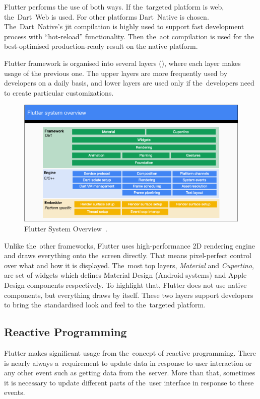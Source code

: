 Flutter performs the use of both ways. If the~targeted platform is web, the~Dart~Web is used. For other platforms Dart~Native is chosen. The~Dart~Native's \gls{jit} compilation is highly used to support fast development process with ``hot-reload'' functionality. Then the~\gls{aot} compilation is used for the best-optimised production-ready result on the native platform.  

Flutter framework is organised into several layers (), where each layer makes usage of the previous one. The upper layers are more frequently used by developers on a daily basis, and lower layers are used only if the~developers need to create particular customizations.

\begin{figure}[htp]
    \centering
    \includegraphics[width=\linewidth]{img/flutter/flutter-layer-cake.png}
    \caption{Flutter System Overview~\cite{flutter-technical-overview}.}
    \label{fig:flutter-layer-cake}
\end{figure}

Unlike the~other frameworks, Flutter uses high-performance 2D rendering engine and draws everything onto the~screen directly. That means pixel-perfect control over what and how it is displayed. The~most top layers, \textit{Material} and \textit{Cupertino}, are set of widgets which defines Material Design (Android systems) and Apple Design components respectively. To highlight that, Flutter does not use native components, but everything draws by itself. These two layers support developers to bring the~standardised look and feel to the~targeted platform.
\subsection{Reactive Programming}
Flutter makes significant usage from the~concept of reactive programming. There is nearly always a~requirement to update data in response to user interaction or any other event such as getting data from the~server. More than that, sometimes it is necessary to update different parts of the~user interface in response to these events. 

